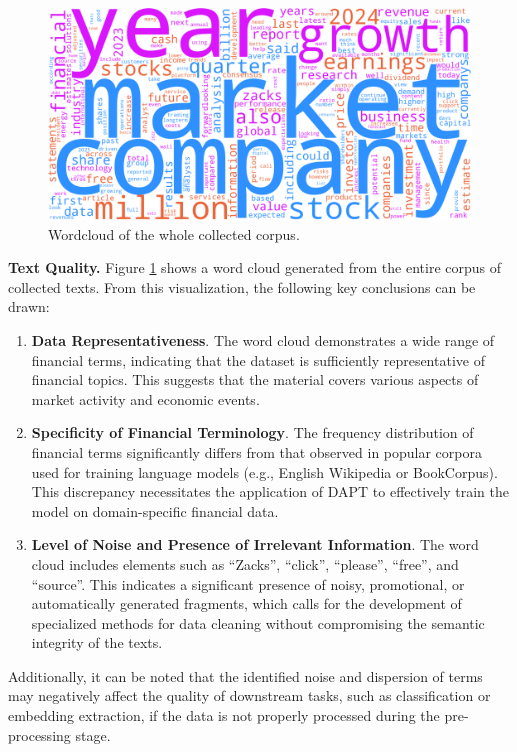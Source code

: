 \begin{figure}[H]
    \centering
    \includegraphics[width=1\linewidth]{img/wordcloud.png}
    \caption{\label{fig:wordcloud}Wordcloud of the whole collected corpus.}
\end{figure}

\textbf{Text Quality.} Figure \ref{fig:wordcloud} shows a word cloud generated from the entire corpus of collected texts.
From this visualization, the following key conclusions can be drawn:

\begin{enumerate}
    \item \textbf{Data Representativeness}. The word cloud demonstrates a wide range of financial terms, indicating that the dataset
    is sufficiently representative of financial topics. This suggests that the material covers various aspects of market activity
    and economic events.
    \item \textbf{Specificity of Financial Terminology}. The frequency distribution of financial terms significantly differs from that observed
    in popular corpora used for training language models (e.g., English Wikipedia or BookCorpus). This discrepancy necessitates the application
    of DAPT to effectively train the model on domain-specific financial data.
    \item \textbf{Level of Noise and Presence of Irrelevant Information}. The word cloud includes elements such as “Zacks”, “click”, “please”,
    “free”, and “source”. This indicates a significant presence of noisy, promotional, or automatically generated fragments, which calls
    for the development of specialized methods for data cleaning without compromising the semantic integrity of the texts.
\end{enumerate}

Additionally, it can be noted that the identified noise and dispersion of terms may negatively affect the quality of downstream tasks,
such as classification or embedding extraction, if the data is not properly processed during the pre-processing stage.

